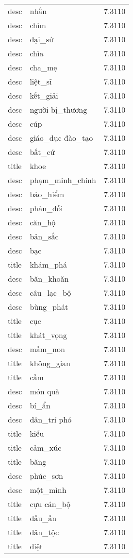 \documentclass{article}
\begin{document}
\begin{tabular}{lll}
desc & nhắn & 7.3110\\
desc & chìm & 7.3110\\
desc & đại\_sứ & 7.3110\\
desc & chìa & 7.3110\\
desc & cha\_mẹ & 7.3110\\
desc & liệt\_sĩ & 7.3110\\
desc & kết\_giải & 7.3110\\
desc & người bị\_thương & 7.3110\\
desc & cúp & 7.3110\\
desc & giáo\_dục đào\_tạo & 7.3110\\
desc & bất\_cứ & 7.3110\\
title & khoe & 7.3110\\
desc & phạm\_minh\_chính & 7.3110\\
desc & bảo\_hiểm & 7.3110\\
desc & phản\_đối & 7.3110\\
desc & căn\_hộ & 7.3110\\
desc & bản\_sắc & 7.3110\\
desc & bạc & 7.3110\\
title & khám\_phá & 7.3110\\
desc & băn\_khoăn & 7.3110\\
desc & câu\_lạc\_bộ & 7.3110\\
desc & bùng\_phát & 7.3110\\
title & cục & 7.3110\\
title & khát\_vọng & 7.3110\\
desc & mầm\_non & 7.3110\\
title & không\_gian & 7.3110\\
title & cầm & 7.3110\\
desc & món quà & 7.3110\\
desc & bí\_ẩn & 7.3110\\
desc & dân\_trí phó & 7.3110\\
title & kiểu & 7.3110\\
title & cảm\_xúc & 7.3110\\
title & băng & 7.3110\\
desc & phúc\_sơn & 7.3110\\
desc & một\_mình & 7.3110\\
title & cựu cán\_bộ & 7.3110\\
title & dấu\_ấn & 7.3110\\
title & dân\_tộc & 7.3110\\
title & diệt & 7.3110\\

\end{tabular}
\end{document}
